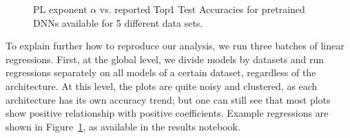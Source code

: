 \begin{figure}[t]
    \centering
    \qquad
    \qquad
    \qquad
    \qquad
    \caption{ PL exponent $\alpha$ vs. reported Top1 Test Accuracies for pretrained DNNs available for 5 different data sets.}
    \label{fig:DSalphas}
\end{figure}

To explain further how to reproduce our analysis, we run three batches of linear regressions. 
First, at the global level, we divide models by datasets and run regressions separately on all models of a certain dataset, regardless of the architecture. 
At this level, the plots are quite noisy and clustered, as each architecture has its own accuracy trend; but one can
 still see that most plots show positive relationship with positive coefficients. 
Example regressions are shown in Figure~\ref{fig:DSalphas}, as available in the results notebook.
 
